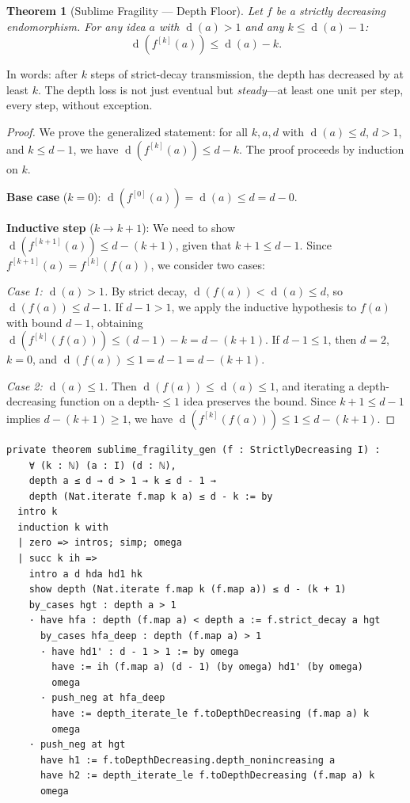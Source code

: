 \documentclass[11pt,openany]{book}
\theoremstyle{definition}
\theoremstyle{plain}
\newtheorem{theorem}[axiom]{Theorem}
\theoremstyle{remark}
\newcommand{\depth}{\operatorname{d}}       %
\begin{document}
\begin{theorem}[Sublime Fragility --- Depth Floor]
\label{thm:sublime-fragility}
Let $f$ be a strictly decreasing endomorphism. For any idea $a$ with $\depth(a) > 1$ and any $k \leq \depth(a) - 1$:
\[
\depth(f^{[k]}(a)) \leq \depth(a) - k.
\]
\end{theorem}

In words: after $k$ steps of strict-decay transmission, the depth has decreased by at least $k$. The depth loss is not just eventual but \emph{steady}---at least one unit per step, every step, without exception.

\begin{proof}
We prove the generalized statement: for all $k, a, d$ with $\depth(a) \leq d$, $d > 1$, and $k \leq d - 1$, we have $\depth(f^{[k]}(a)) \leq d - k$. The proof proceeds by induction on $k$.

\textbf{Base case} ($k = 0$): $\depth(f^{[0]}(a)) = \depth(a) \leq d = d - 0$.

\textbf{Inductive step} ($k \to k + 1$): We need to show $\depth(f^{[k+1]}(a)) \leq d - (k+1)$, given that $k + 1 \leq d - 1$. Since $f^{[k+1]}(a) = f^{[k]}(f(a))$, we consider two cases:

\emph{Case 1: $\depth(a) > 1$.} By strict decay, $\depth(f(a)) < \depth(a) \leq d$, so $\depth(f(a)) \leq d - 1$. If $d - 1 > 1$, we apply the inductive hypothesis to $f(a)$ with bound $d - 1$, obtaining $\depth(f^{[k]}(f(a))) \leq (d-1) - k = d - (k+1)$. If $d - 1 \leq 1$, then $d = 2$, $k = 0$, and $\depth(f(a)) \leq 1 = d - 1 = d - (k+1)$.

\emph{Case 2: $\depth(a) \leq 1$.} Then $\depth(f(a)) \leq \depth(a) \leq 1$, and iterating a depth-decreasing function on a depth-${\leq}1$ idea preserves the bound. Since $k + 1 \leq d - 1$ implies $d - (k+1) \geq 1$, we have $\depth(f^{[k]}(f(a))) \leq 1 \leq d - (k+1)$.
\end{proof}

\begin{lstlisting}
private theorem sublime_fragility_gen (f : StrictlyDecreasing I) :
    ∀ (k : ℕ) (a : I) (d : ℕ),
    depth a ≤ d → d > 1 → k ≤ d - 1 →
    depth (Nat.iterate f.map k a) ≤ d - k := by
  intro k
  induction k with
  | zero => intros; simp; omega
  | succ k ih =>
    intro a d hda hd1 hk
    show depth (Nat.iterate f.map k (f.map a)) ≤ d - (k + 1)
    by_cases hgt : depth a > 1
    · have hfa : depth (f.map a) < depth a := f.strict_decay a hgt
      by_cases hfa_deep : depth (f.map a) > 1
      · have hd1' : d - 1 > 1 := by omega
        have := ih (f.map a) (d - 1) (by omega) hd1' (by omega)
        omega
      · push_neg at hfa_deep
        have := depth_iterate_le f.toDepthDecreasing (f.map a) k
        omega
    · push_neg at hgt
      have h1 := f.toDepthDecreasing.depth_nonincreasing a
      have h2 := depth_iterate_le f.toDepthDecreasing (f.map a) k
      omega
\end{lstlisting}
\end{document}

